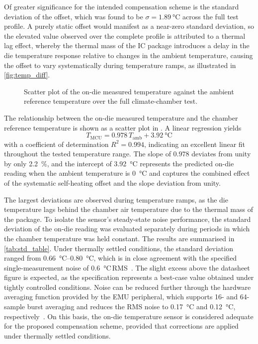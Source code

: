 Of greater significance for the intended compensation scheme is the standard deviation of
the offset, which was found to be $\sigma = \SI{1.89}{\celsius}$ across the full test
profile.
A purely static offset would manifest as a near-zero standard deviation, so the elevated
value observed over the complete profile is attributed to a thermal lag effect, whereby
the thermal mass of the IC package introduces a delay in the die temperature response
relative to changes in the ambient temperature, causing the offset to vary
systematically during temperature ramps, as illustrated in \cref{fig:temp_diff}.

\begin{figure}
    \centering
    
    \caption{Scatter plot of the on-die measured temperature against the ambient reference
             temperature over the full climate-chamber test.}
    \label{fig:temp_scatter}
\end{figure}

The relationship between the on-die measured temperature and the chamber reference temperature is shown as a scatter plot in . A linear regression yields
\begin{equation}
    T_{\mathrm{MCU}} = 0.978\,T_{\mathrm{amb}} + \SI{3.92}{\celsius}
    \label{eq:temp_fit}
\end{equation}
with a coefficient of determination $R^2 = 0.994$, indicating an excellent linear fit throughout the tested temperature range. The slope of $0.978$ deviates from unity by only \SI{2.2}{\percent}, and the intercept of \SI{3.92}{\celsius} represents the predicted on-die reading when the ambient temperature is \SI{0}{\celsius} and captures the combined effect of the systematic self-heating offset and the slope deviation from unity. %

The largest deviations are observed during temperature ramps, as the die temperature lags
behind the chamber air temperature due to the thermal mass of the package.
To isolate the sensor's steady-state noise performance, the standard deviation of the
on-die reading was evaluated separately during periods in which the chamber temperature
was held constant.
The results are summarised in \cref{tab:std_table}.
Under thermally settled conditions, the standard deviation ranged from
\SIrange{0.66}{0.80}{\celsius}, which is in close agreement with the specified
single-measurement noise of \SI{0.6}{\celsius}\,RMS~\cite{EFR32MG22E}.
The slight excess above the datasheet figure is expected, as the specification represents
a best-case value obtained under tightly controlled conditions.
Noise can be reduced further through the hardware averaging function provided by the EMU
peripheral, which supports 16- and 64-sample burst averaging and reduces the RMS noise to
\SI{0.17}{\celsius} and \SI{0.12}{\celsius}, respectively~\cite{EFR32MG22E}.
On this basis, the on-die temperature sensor is considered adequate for the proposed
compensation scheme, provided that corrections are applied under thermally settled
conditions.


